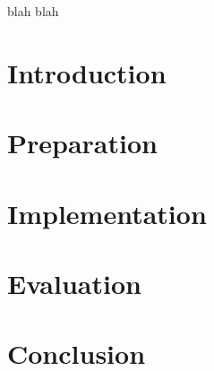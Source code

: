 \documentclass[12pt]{report}
\begin{document}
blah blah

\tableofcontents

\chapter{Introduction}



\chapter{Preparation}



\chapter{Implementation}



\chapter{Evaluation} \label{evaluation}



\chapter{Conclusion}



% 
% 


{}
\end{document}
